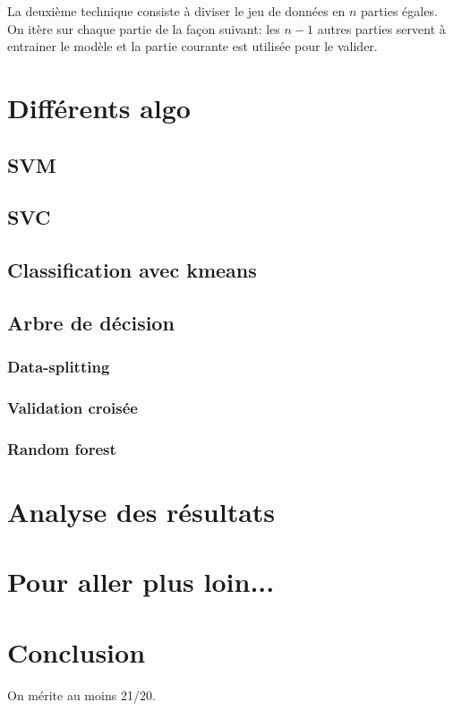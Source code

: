 \documentclass[11pt,a4paper]{article}
\begin{document}
		La deuxième technique consiste à diviser le jeu de données en $n$ parties égales. On itère sur chaque partie de la façon suivant: les $n-1$ autres parties servent à entrainer le modèle et la partie courante est utilisée pour le valider. 

\section{Différents algo}
	\subsection{SVM}
	\subsection{SVC}
	\subsection{Classification avec kmeans}
	\subsection{Arbre de décision}

		\subsubsection{Data-splitting}




		\subsubsection{Validation croisée}		


		\subsubsection{Random forest}

\section{Analyse des résultats}

\section{Pour aller plus loin...}

\section{Conclusion}
	On mérite au moins 21/20.




%
\end{document}

